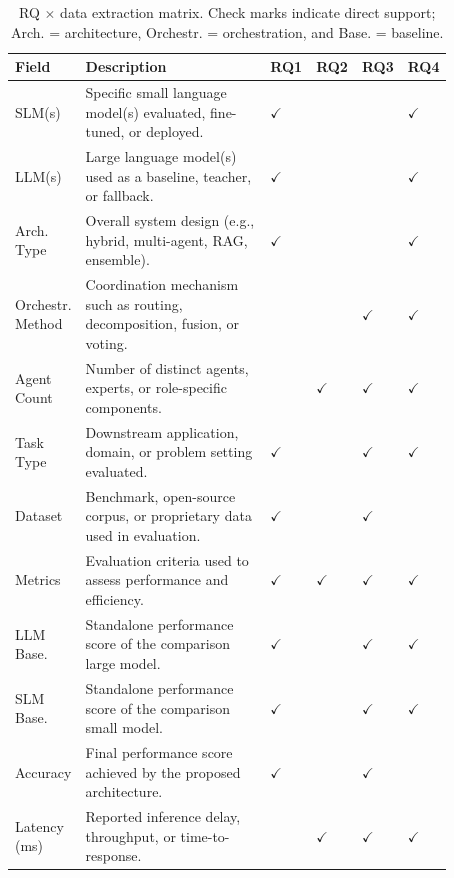 {\scriptsize
\setlength{\tabcolsep}{2pt}
\renewcommand{\arraystretch}{0.9}
\begin{table}[!htbp]
\centering
\caption{RQ $\times$ data extraction matrix. Check marks indicate direct support; Arch. = architecture, Orchestr. = orchestration, and Base. = baseline.}
\label{tab:rq-matrix}
\begin{tabular}{@{}p{0.12\linewidth}p{0.51\linewidth}>{\centering\arraybackslash}p{0.061\linewidth}>{\centering\arraybackslash}p{0.061\linewidth}>{\centering\arraybackslash}p{0.061\linewidth}>{\centering\arraybackslash}p{0.061\linewidth}@{}}
\toprule
\textbf{Field} & \textbf{Description} & \textbf{RQ1} & \textbf{RQ2} & \textbf{RQ3} & \textbf{RQ4} \\
\midrule
SLM(s) & Specific small language model(s) evaluated, fine-tuned, or deployed. & $\checkmark$ &  &  & $\checkmark$ \\
LLM(s) & Large language model(s) used as a baseline, teacher, or fallback. & $\checkmark$ &  &  & $\checkmark$ \\
Arch. Type & Overall system design (e.g., hybrid, multi-agent, RAG, ensemble). & $\checkmark$ &  &  & $\checkmark$ \\
Orchestr. Method & Coordination mechanism such as routing, decomposition, fusion, or voting. &  &  & $\checkmark$ & $\checkmark$ \\
Agent Count & Number of distinct agents, experts, or role-specific components. &  & $\checkmark$ & $\checkmark$ & $\checkmark$ \\
Task Type & Downstream application, domain, or problem setting evaluated. & $\checkmark$ &  & $\checkmark$ & $\checkmark$ \\
Dataset & Benchmark, open-source corpus, or proprietary data used in evaluation. & $\checkmark$ &  & $\checkmark$ &  \\
Metrics & Evaluation criteria used to assess performance and efficiency. & $\checkmark$ & $\checkmark$ & $\checkmark$ & $\checkmark$ \\
LLM Base. & Standalone performance score of the comparison large model. & $\checkmark$ &  & $\checkmark$ & $\checkmark$ \\
SLM Base. & Standalone performance score of the comparison small model. & $\checkmark$ &  & $\checkmark$ & $\checkmark$ \\
Accuracy & Final performance score achieved by the proposed architecture. & $\checkmark$ &  & $\checkmark$ &  \\
Latency (ms) & Reported inference delay, throughput, or time-to-response. &  & $\checkmark$ & $\checkmark$ & $\checkmark$ \\

\end{tabular}
\end{table}}
